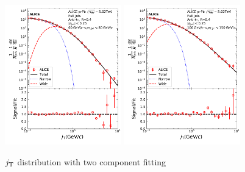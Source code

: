 \begin{figure}[htb]
\begin{center}
\includegraphics[width=0.45\textwidth]{figures/results/JtSignalFinalFitJetPt5.pdf}
\includegraphics[width=0.45\textwidth]{figures/results/JtSignalFinalFitJetPt7.pdf}
\caption{$j_{\rm T}$ distribution with two component fitting}
\label{fig:fits}
\end{center}
\end{figure}


